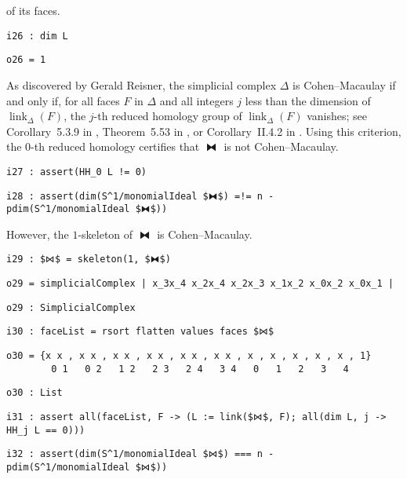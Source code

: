 \documentclass[12pt,leqno]{amsart}
\theoremstyle{definition}
\begin{document}
of its faces.
\begin{lstlisting}[xleftmargin=10pt, aboveskip=3.0pt, belowskip=1.5pt]
i26 : dim L
\end{lstlisting}
\begin{lstlisting}[xleftmargin=10pt, aboveskip=1.5pt, belowskip=3.0pt]
o26 = 1
\end{lstlisting}
As discovered by Gerald Reisner, the simplicial complex $\Delta$ is
Cohen--Macaulay if and only if, for all faces $F$ in $\Delta$ and all integers
$j$ less than the dimension of $\operatorname{link}_\Delta(F)$, the $j$-th
reduced homology group of $\operatorname{link}_\Delta(F)$ vanishes; see
Corollary~5.3.9 in \cite{BH}, Theorem~5.53 in \cite{MS}, or Corollary~II.4.2
in \cite{Stanley}.  Using this criterion, the $0$-th reduced homology
certifies that $⧓$ is not Cohen--Macaulay.
\begin{lstlisting}[xleftmargin=10pt, aboveskip=3.0pt, belowskip=1.5pt]
i27 : assert(HH_0 L != 0)
\end{lstlisting}
\begin{lstlisting}[xleftmargin=10pt, aboveskip=1.5pt, belowskip=3.0pt]
i28 : assert(dim(S^1/monomialIdeal $⧓$) =!= n - pdim(S^1/monomialIdeal $⧓$))
\end{lstlisting}
However, the $1$-skeleton of $⧓$ is Cohen--Macaulay.
\begin{lstlisting}[xleftmargin=10pt, aboveskip=3.0pt, belowskip=1.5pt]
i29 : $⋈$ = skeleton(1, $⧓$)
\end{lstlisting}
\begin{lstlisting}[xleftmargin=10pt, aboveskip=1.5pt, belowskip=1.5pt]
o29 = simplicialComplex | x_3x_4 x_2x_4 x_2x_3 x_1x_2 x_0x_2 x_0x_1 |
\end{lstlisting}
\begin{lstlisting}[xleftmargin=10pt, aboveskip=1.5pt, belowskip=1.5pt]
o29 : SimplicialComplex
\end{lstlisting}
\begin{lstlisting}[xleftmargin=10pt, aboveskip=1.5pt, belowskip=1.5pt]
i30 : faceList = rsort flatten values faces $⋈$
\end{lstlisting}
\begin{lstlisting}[xleftmargin=10pt, lineskip=-10pt, aboveskip=4pt, belowskip=1pt]
o30 = {x x , x x , x x , x x , x x , x x , x , x , x , x , x , 1}
        0 1   0 2   1 2   2 3   2 4   3 4   0   1   2   3   4
\end{lstlisting}
\begin{lstlisting}[xleftmargin=10pt, aboveskip=1.5pt, belowskip=1.5pt]
o30 : List
\end{lstlisting}
\begin{lstlisting}[xleftmargin=10pt, aboveskip=1.5pt, belowskip=1.5pt]
i31 : assert all(faceList, F -> (L := link($⋈$, F); all(dim L, j -> HH_j L == 0)))
\end{lstlisting}
\begin{lstlisting}[xleftmargin=10pt, aboveskip=1.5pt, belowskip=3.0pt]
i32 : assert(dim(S^1/monomialIdeal $⋈$) === n - pdim(S^1/monomialIdeal $⋈$))
\end{lstlisting}
\end{document}
